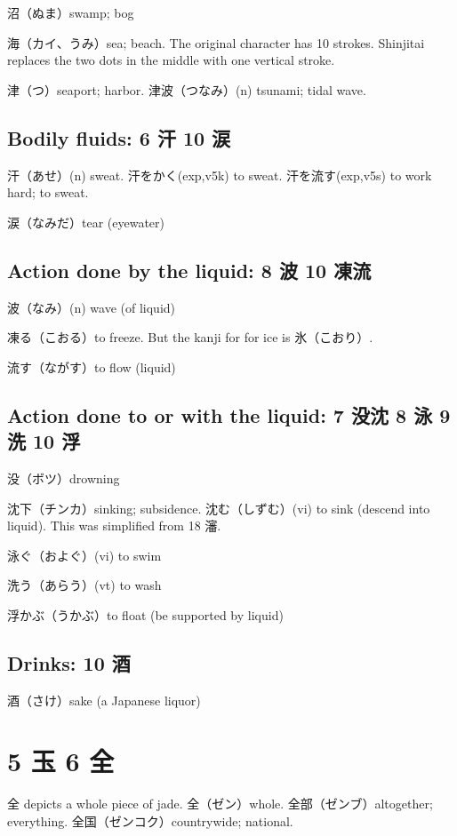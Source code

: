 沼（ぬま）swamp; bog

海（カイ、うみ）sea; beach.
The original character has 10 strokes.
Shinjitai replaces the two dots in the middle
with one vertical stroke.

津（つ）seaport; harbor.
津波（つなみ）(n) tsunami; tidal wave.

\subsection{Bodily fluids: 6 汗 10 涙}

汗（あせ）(n) sweat.
汗をかく(exp,v5k) to sweat.
汗を流す(exp,v5s) to work hard; to sweat.

涙（なみだ）tear (eyewater)

\subsection{Action done by the liquid: 8 波 10 凍流}

波（なみ）(n) wave (of liquid)

凍る（こおる）to freeze.
But the kanji for for ice is 氷（こおり）.

流す（ながす）to flow (liquid)

\subsection{Action done to or with the liquid: 7 没沈 8 泳 9 洗 10 浮}

没（ボツ）drowning

沈下（チンカ）sinking; subsidence.
沈む（しずむ）(vi) to sink (descend into liquid).
This was simplified from 18 瀋.

泳ぐ（およぐ）(vi) to swim

洗う（あらう）(vt) to wash

浮かぶ（うかぶ）to float (be supported by liquid)

\subsection{Drinks: 10 酒}

酒（さけ）sake (a Japanese liquor)

\section{5 玉 6 全}

全 depicts a whole piece of jade.
全（ゼン）whole.
全部（ゼンブ）altogether; everything.
全国（ゼンコク）countrywide; national.

